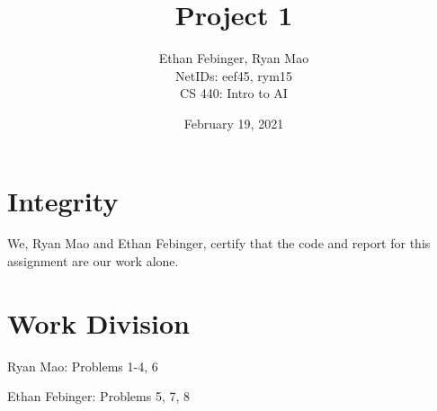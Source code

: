\documentclass[12pt, twoside]{article}
\newcommand{\name}{Ethan Febinger, Ryan Mao \\ NetIDs: eef45, rym15}
\newcommand{\class}{CS 440: Intro to AI}
\newcommand{\hwTitle}{Project 1} %
\newcommand{\due}{February 19, 2021} %
\begin{document}
 
 
\title{\hwTitle} %
\author{\name\\  %
\class} %
\date{\due}
 
\maketitle

\section*{Integrity}

We, Ryan Mao and Ethan Febinger, certify that the code and report for this assignment are our work alone.

\section*{Work Division}

    Ryan Mao: Problems 1-4, 6 

    \noindent Ethan Febinger: Problems 5, 7, 8


\tableofcontents
\vfill
\pagebreak
\end{document}
